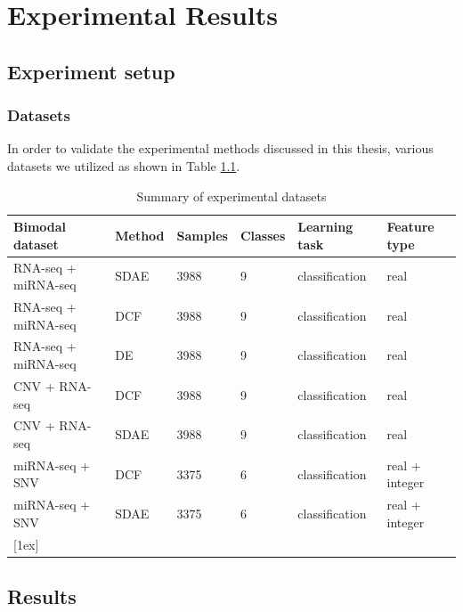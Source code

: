 \chapter{Experimental Results} \label{chap:results}

\section{Experiment setup}
\subsection{Datasets}

In order to validate the experimental methods discussed in this thesis, various datasets we utilized as shown in Table \ref{table:expData}. 


\begin{table}[ht]
\caption{Summary of experimental datasets} %
\centering %
\begin{tabular}{l l l l l l} %
\hline %
Bimodal dataset & Method & Samples & Classes & Learning task & Feature type \\ %
\hline %
RNA-seq + miRNA-seq & SDAE & 3988 & 9 & classification & real\\ 
RNA-seq + miRNA-seq & DCF & 3988 & 9 & classification & real\\ 
RNA-seq + miRNA-seq & DE & 3988 & 9 & classification & real\\ 
CNV + RNA-seq & DCF & 3988 & 9 & classification & real\\ 
CNV + RNA-seq & SDAE & 3988 & 9 & classification & real\\ 
miRNA-seq + SNV & DCF & 3375 & 6 & classification & real + integer\\ miRNA-seq + SNV & SDAE & 3375 & 6 & classification & real + integer\\ 
[1ex]   %
\hline %
\end{tabular}
\label{table:expData}
\end{table}

\section{Results}


